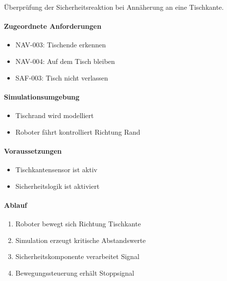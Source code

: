 \documentclass[
  a4paper,
  12pt,
  DIV=12,        %
  parskip=half,  %
  headings=small %
]{scrartcl}
\theoremstyle{definition}
\providecommand{\tightlist}{%
  \setlength{\itemsep}{0pt}\setlength{\parskip}{0pt}}
\theoremstyle{definition}
\begin{document}
Überprüfung der Sicherheitsreaktion bei Annäherung an eine Tischkante.

\paragraph{Zugeordnete
Anforderungen}\label{zugeordnete-anforderungen-18}

\begin{itemize}
\tightlist
\item
  NAV-003: Tischende erkennen
\item
  NAV-004: Auf dem Tisch bleiben
\item
  SAF-003: Tisch nicht verlassen
\end{itemize}

\paragraph{Simulationsumgebung}\label{simulationsumgebung-3}

\begin{itemize}
\tightlist
\item
  Tischrand wird modelliert
\item
  Roboter fährt kontrolliert Richtung Rand
\end{itemize}

\paragraph{Voraussetzungen}\label{voraussetzungen-18}

\begin{itemize}
\tightlist
\item
  Tischkantensensor ist aktiv
\item
  Sicherheitslogik ist aktiviert
\end{itemize}

\paragraph{Ablauf}\label{ablauf-18}

\begin{enumerate}
\def\labelenumi{\arabic{enumi}.}
\tightlist
\item
  Roboter bewegt sich Richtung Tischkante
\item
  Simulation erzeugt kritische Abstandswerte
\item
  Sicherheitskomponente verarbeitet Signal
\item
  Bewegungssteuerung erhält Stoppsignal
\end{enumerate}
\end{document}
